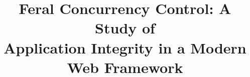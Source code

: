 \documentclass{sig-alternate}
\theoremstyle{definition}
\begin{document}
%

\title{Feral Concurrency Control: A Study of\\Application Integrity in
  a Modern Web Framework}

{\author{}}
\maketitle





















 



\balance
\end{document}
